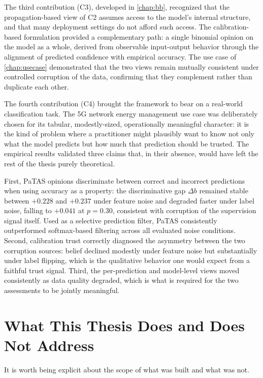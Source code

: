 The third contribution (C3), developed in \cref{chap:bb}, recognized that the propagation-based view of C2 assumes access to the model's internal structure, and that many deployment settings do not afford such access. The calibration-based formulation provided a complementary path: a single binomial opinion on the model as a whole, derived from observable input-output behavior through the alignment of predicted confidence with empirical accuracy. The use case of \cref{chap:usecase} demonstrated that the two views remain mutually consistent under controlled corruption of the data, confirming that they complement rather than duplicate each other.

The fourth contribution (C4) brought the framework to bear on a real-world classification task. The 5G network energy management use case was deliberately chosen for its tabular, modestly-sized, operationally meaningful character: it is the kind of problem where a practitioner might plausibly want to know not only what the model predicts but how much that prediction should be trusted. The empirical results validated three claims that, in their absence, would have left the rest of the thesis purely theoretical. 

First, \ac{PaTAS} opinions discriminate between correct and incorrect predictions when using accuracy as a property: the discriminative gap $\Delta b$ remained stable between $+0.228$ and $+0.237$ under feature noise and degraded faster under label noise, falling to $+0.041$ at $p = 0.30$, consistent with corruption of the supervision signal itself. Used as a selective prediction filter, \ac{PaTAS} consistently outperformed softmax-based filtering across all evaluated noise conditions. Second, calibration trust correctly diagnosed the asymmetry between the two corruption sources: belief declined modestly under feature noise but substantially under label flipping, which is the qualitative behavior one would expect from a faithful trust signal. Third, the per-prediction and model-level views moved consistently as data quality degraded, which is what is required for the two assessments to be jointly meaningful.

\section{What This Thesis Does and Does Not Address}
\label{sec:conclusion-scope}

It is worth being explicit about the scope of what was built and what was not.

